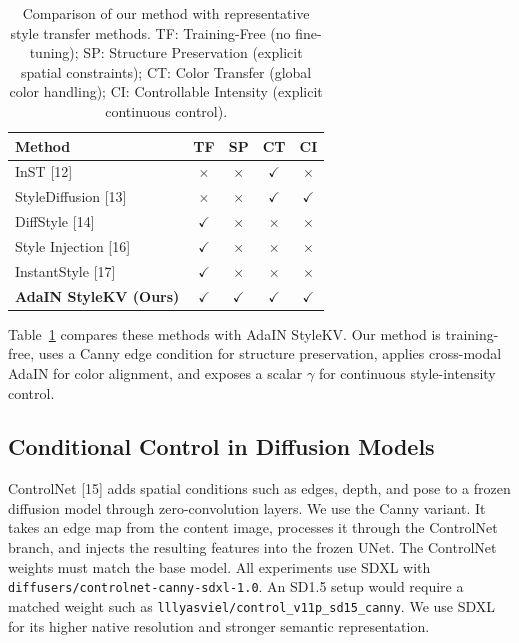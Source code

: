 \documentclass[10pt,twocolumn]{article}
\newcommand{\cmark}{$\checkmark$}
\newcommand{\xmark}{$\times$}
\begin{document}
\begin{table}[htbp]
  \centering
  \caption{Comparison of our method with representative style transfer methods. TF: Training-Free (no fine-tuning); SP: Structure Preservation (explicit spatial constraints); CT: Color Transfer (global color handling); CI: Controllable Intensity (explicit continuous control).}
  \label{tab:method_comparison}
  \small
  \setlength{\tabcolsep}{3pt}
  \begin{tabular}{lcccc}
    \toprule
    Method & TF & SP & CT & CI \\
    \midrule
    InST [12] & \xmark & \xmark & \cmark & \xmark \\
    StyleDiffusion [13] & \xmark & \xmark & \cmark & \cmark \\
    DiffStyle [14] & \cmark & \xmark & \xmark & \xmark \\
    Style Injection [16] & \cmark & \xmark & \xmark & \xmark \\
    InstantStyle [17] & \cmark & \xmark & \xmark & \xmark \\
    \textbf{AdaIN StyleKV (Ours)} & \cmark & \cmark & \cmark & \cmark \\
    \bottomrule
  \end{tabular}
\end{table}

Table~\ref{tab:method_comparison} compares these methods with AdaIN StyleKV. Our method is training-free, uses a Canny edge condition for structure preservation, applies cross-modal AdaIN for color alignment, and exposes a scalar $\gamma$ for continuous style-intensity control.

\subsection{Conditional Control in Diffusion Models}

ControlNet [15] adds spatial conditions such as edges, depth, and pose to a frozen diffusion model through zero-convolution layers. We use the Canny variant. It takes an edge map from the content image, processes it through the ControlNet branch, and injects the resulting features into the frozen UNet. The ControlNet weights must match the base model. All experiments use SDXL with \texttt{diffusers/controlnet-canny-sdxl-1.0}. An SD1.5 setup would require a matched weight such as \texttt{lllyasviel/control\_v11p\_sd15\_canny}. We use SDXL for its higher native resolution and stronger semantic representation.

\end{document}
